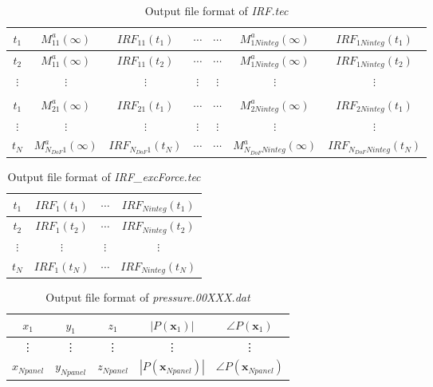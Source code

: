 \documentclass[12pt,a4paper,titlepage]{article}
\newcommand{\bs}{\boldsymbol}
\begin{document}
\begin{table}[ht]
\begin{center}
\caption{Output file format of \textit{IRF.tec}}\label{tab:IRF}
\begin{tabular}{ccccccc}
\hline
$t_1$ & $M^a_{11}(\infty)$ &$IRF_{11}(t_1)$ & $\cdots$ & $\cdots$ & $M^a_{1Ninteg}(\infty)$ &$IRF_{1Ninteg}(t_1)$ \\
\hline
$t_2$ & $M^a_{11}(\infty)$ &$IRF_{11}(t_2)$ & $\cdots$ & $\cdots$ & $M^a_{1Ninteg}(\infty)$ &$IRF_{1Ninteg}(t_2)$ \\
\hline
$\vdots$& $\vdots$ & $\vdots$ & $\vdots$ &$\vdots$ &$\vdots$  &$\vdots$\\
\hline
&&& & &&\\
\hline
$t_1$ & $M^a_{21}(\infty)$ &$IRF_{21}(t_1)$ & $\cdots$ & $\cdots$ & $M^a_{2Ninteg}(\infty)$ &$IRF_{2Ninteg}(t_1)$ \\
\hline
$\vdots$& $\vdots$ & $\vdots$ & $\vdots$ &$\vdots$ &$\vdots$  &$\vdots$\\
\hline
$t_N$ & $M^a_{N_{DoF}1}(\infty)$ &$IRF_{N_{DoF}1}(t_N)$ & $\cdots$ & $\cdots$ & $M^a_{N_{DoF}Ninteg}(\infty)$ &$IRF_{N_{DoF}Ninteg}(t_N)$ \\
\hline
\end{tabular}
\end{center}
\end{table}

\begin{table}[ht]
\begin{center}
\caption{Output file format of \textit{IRF\_excForce.tec}}\label{tab:IRFExcF}
\begin{tabular}{cccc}
\hline
$t_1$ &$IRF_{1}(t_1)$ & $\cdots$ &$IRF_{Ninteg}(t_1)$ \\
\hline
$t_2$ &$IRF_{1}(t_2)$ & $\cdots$ &$IRF_{Ninteg}(t_2)$ \\
\hline
$\vdots$& $\vdots$ & $\vdots$ & $\vdots$ \\
\hline
$t_N$ &$IRF_{1}(t_N)$ & $\cdots$ &$IRF_{Ninteg}(t_N)$ \\
\hline
\end{tabular}
\end{center}
\end{table}

\begin{table}[ht]
\begin{center}
\caption{Output file format of \textit{pressure.00XXX.dat}}\label{tab:pressure}
\begin{tabular}{ccccc}
\hline
$x_1$ &$y_1$ &$z_1$ &$|P(\bs x_1)|$ & $\angle P(\bs x_1)$\\
\hline
\vdots &\vdots &\vdots &\vdots &\vdots
\\
\hline
$x_{Npanel}$ &$y_{Npanel}$ &$z_{Npanel}$ &$|P(\bs x_{Npanel})|$ & $\angle P(\bs x_{Npanel})$\\
\hline
\end{tabular}
\end{center}
\end{table}
\end{document}
